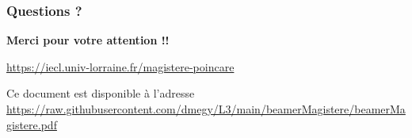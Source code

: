 \documentclass[slidetop,11pt]{beamer}
\begin{document}
\begin{frame}
\frametitle{Questions ?}

\begin{center}
{\LARGE \bf Merci pour votre attention !!}

\bigskip
{}

\bigskip
\url{https://iecl.univ-lorraine.fr/magistere-poincare}

\bigskip
{\small Ce document est disponible à l'adresse\\
\url{https://raw.githubusercontent.com/dmegy/L3/main/beamerMagistere/beamerMagistere.pdf}}
\end{center}
\end{frame}
  
\end{document}
